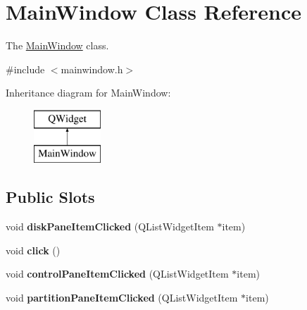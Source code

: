 \hypertarget{class_main_window}{}\section{Main\+Window Class Reference}
\label{class_main_window}


The \mbox{\hyperlink{class_main_window}{Main\+Window}} class.  




{\ttfamily \#include $<$mainwindow.\+h$>$}

Inheritance diagram for Main\+Window\+:\begin{figure}[H]
\begin{center}
\leavevmode
\includegraphics[height=2.000000cm]{class_main_window}
\end{center}
\end{figure}
\subsection*{Public Slots}
\begin{DoxyCompactItemize}
\item 
\mbox{\label{class_main_window_a59fc90a3e94d7b3749a01420154b7180}} 
void {\bfseries disk\+Pane\+Item\+Clicked} (Q\+List\+Widget\+Item $\ast$item)
\item 
\mbox{\label{class_main_window_a1c0253c5f8350142145e647ba11b4eb5}} 
void {\bfseries click} ()
\item 
\mbox{\label{class_main_window_a3c3e137427fb9ef9f774f08d40b98d7b}} 
void {\bfseries control\+Pane\+Item\+Clicked} (Q\+List\+Widget\+Item $\ast$item)
\item 
\mbox{\label{class_main_window_a6b7db1a39889962fc97e0f8a0840ab4c}} 
void {\bfseries partition\+Pane\+Item\+Clicked} (Q\+List\+Widget\+Item $\ast$item)
\end{DoxyCompactItemize}
